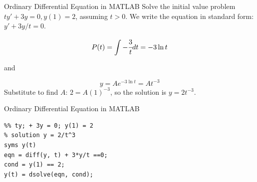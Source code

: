 \documentclass[aspectratio=169,xcolor=dvipsnames,svgnames,x11names,fleqn]{beamer}
\begin{document}
\begin{frame}{Ordinary Differential Equation in MATLAB}
Solve the initial value problem $ty' + 3y = 0, y(1) = 2$, assuming $t > 0$. We write the equation in standard form: $y' + 3y/t = 0$.

$$
P(t) = \int -\cfrac{3}{t}dt  = -3 \ln t
$$

and


$$
y = Ae^{-3\ln t} = At^{-3}
$$
Substitute to find $A$: $ 2= A(1)^{-3}$, so the solution is $y = 2t^{-3}$.
    
\end{frame}


\begin{frame}[containsverbatim]{Ordinary Differential Equation in MATLAB}
    \small
    \begin{verbatim}
%% ty; + 3y = 0; y(1) = 2
% solution y = 2/t^3
syms y(t)
eqn = diff(y, t) + 3*y/t ==0;
cond = y(1) == 2;
y(t) = dsolve(eqn, cond);
    \end{verbatim}
\end{frame}
\end{document}

